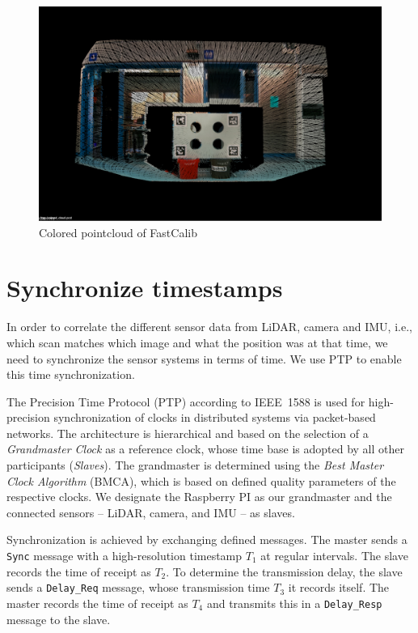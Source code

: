 \documentclass[english, bachelor, utf8]{base/thesis_telematics}
\begin{document}
\begin{figure}[ht!]
    \centering
    \includegraphics[width=0.7\linewidth]{pics/extrinsic_calib_global.png}
    \caption{Colored pointcloud of FastCalib}
    \label{fig:reprojection}
\end{figure}

    
\section{Synchronize timestamps}
\label{sec:PTP}
In order to correlate the different sensor data from LiDAR, camera and IMU,
i.e., which scan matches which image and what the position was at that time,
we need to synchronize the sensor systems in terms of time.
We use PTP to enable this time synchronization.

The Precision Time Protocol (PTP) according to IEEE~1588 is used for high-precision
synchronization of clocks in distributed systems via packet-based
networks. The architecture is hierarchical and based on
the selection of a \emph{Grandmaster Clock} as a reference clock, whose
time base is adopted by all other participants (\emph{Slaves}).
The grandmaster is determined using the \emph{Best Master
Clock Algorithm} (BMCA), which is based on defined quality parameters of the
respective clocks.
We designate the Raspberry PI as our grandmaster and the connected 
sensors -- LiDAR, camera, and IMU -- as slaves.~\cite{eidson2002ieee}

Synchronization is achieved by exchanging defined messages.
The master sends a
\texttt{Sync} message with a high-resolution timestamp $T_1$ at regular intervals. The
slave records the time of receipt as $T_2$. To determine the
transmission delay, the slave sends a
\texttt{Delay\_Req} message, whose transmission time $T_3$ it records itself.
The master records the time of receipt as $T_4$ and transmits
this in a \texttt{Delay\_Resp} message to the slave.~\cite{wikipediaPTP}
\end{document}
